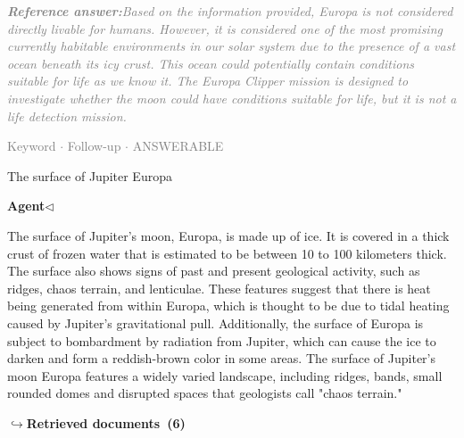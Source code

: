 \documentclass[a4paper,11pt]{article}
\begin{document}
\begin{refanswerenv}
{\footnotesize\textit{\textcolor{gray}{\textbf{Reference answer:}\enspace Based on the information provided, Europa is not considered directly livable for humans. However, it is considered one of the most promising currently habitable environments in our solar system due to the presence of a vast ocean beneath its icy crust. This ocean could potentially contain conditions suitable for life as we know it. The Europa Clipper mission is designed to investigate whether the moon could have conditions suitable for life, but it is not a life detection mission.}}}
\end{refanswerenv}
\vspace{0.5em}
\hfill{\tiny\textcolor{gray}{Keyword $\cdot$ Follow-up $\cdot$ ANSWERABLE}}
\begin{userbubble}
The surface of Jupiter Europa
\end{userbubble}
\noindent\hfill{\small\textcolor{agentcolor}{\textbf{Agent\enspace$\triangleleft$}}}
\begin{agentbubble}
The surface of Jupiter's moon, Europa, is made up of ice. It is covered in a thick crust of frozen water that is estimated to be between 10 to 100 kilometers thick. The surface also shows signs of past and present geological activity, such as ridges, chaos terrain, and lenticulae. These features suggest that there is heat being generated from within Europa, which is thought to be due to tidal heating caused by Jupiter's gravitational pull. Additionally, the surface of Europa is subject to bombardment by radiation from Jupiter, which can cause the ice to darken and form a reddish-brown color in some areas. The surface of Jupiter's moon Europa features a widely varied landscape, including ridges, bands, small rounded domes and disrupted spaces that geologists call "chaos terrain."
\end{agentbubble}
\noindent\hfill{\footnotesize\textcolor{doccolor}{\textbf{$\hookrightarrow$\enspace Retrieved documents~(6)}}}
\end{document}
